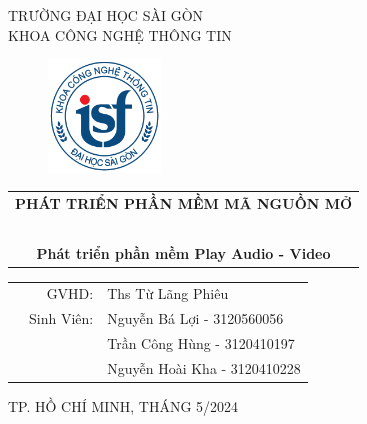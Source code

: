 \documentclass[a4paper]{article}
\begin{document}
\begin{titlepage}
\begin{center}
TRƯỜNG ĐẠI HỌC SÀI GÒN \\
KHOA CÔNG NGHỆ THÔNG TIN
\end{center}
\vspace{1cm}

\begin{figure}[h!]
\begin{center}
\includegraphics[width=3cm]{logoITSGU.png}
\end{center}
\end{figure}

\vspace{1cm}

\begin{center}
\begin{tabular}{c}
	\multicolumn{1}{l}{\hspace{0,5cm}\textbf{{\Large \color{black} PHÁT TRIỂN PHẦN MỀM MÃ NGUỒN MỞ}}}\\
	~~\\

	\textbf{{\Large \color{black} Phát triển phần mềm Play Audio - Video}}\\

\end{tabular}
\end{center}

\vspace{3cm}
\begin{table}[h]
\begin{tabular}{rrl}
\hspace {5 cm} &\color{black} GVHD: & \color{black}Ths Từ Lãng Phiêu\\
&\color{black} Sinh Viên: &\color{black} Nguyễn Bá Lợi - 3120560056\\
      &&\color{black} Trần Công Hùng -  3120410197\\
      && \color{black}Nguyễn Hoài Kha -  3120410228\\

\end{tabular}
\vspace{1.5 cm}
\end{table}

\begin{center}
{\footnotesize TP. HỒ CHÍ MINH, THÁNG 5/2024}
\end{center}
\end{titlepage}
\end{document}
